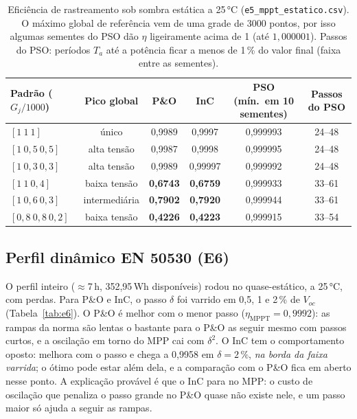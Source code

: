 \documentclass[3p,authoryear]{elsarticle}
\newcommand{\etaM}{\eta_{\mathrm{MPPT}}}
\begin{document}
\begin{table}[!htbp]
\centering\small
\begin{tabular}{lccccc}
\toprule
Padrão ($G_j/1000$) & Pico global & P\&O & InC & PSO (mín.\ em 10 sementes) &
Passos do PSO \\
\midrule
$[1\ 1\ 1]$         & único       & 0,9989 & 0,9997 & 0,999993 & 24--48 \\
$[1\ 0{,}5\ 0{,}5]$ & alta tensão & 0,9987 & 0,9998 & 0,999995 & 24--48 \\
$[1\ 0{,}3\ 0{,}3]$ & alta tensão & 0,9989 & 0,99997 & 0,999992 & 24--48 \\
$[1\ 1\ 0{,}4]$     & baixa tensão & \textbf{0,6743} & \textbf{0,6759} & 0,999933 & 33--61 \\
$[1\ 0{,}6\ 0{,}3]$ & intermediária & \textbf{0,7902} & \textbf{0,7920} & 0,999944 & 33--61 \\
$[0{,}8\ 0{,}8\ 0{,}2]$ & baixa tensão & \textbf{0,4226} & \textbf{0,4223} & 0,999915 & 33--54 \\
\bottomrule
\end{tabular}
\caption{Eficiência de rastreamento sob sombra estática a 25\,°C
(\texttt{e5\_mppt\_estatico.csv}). O máximo global de referência vem de uma grade de 3000
pontos, por isso algumas sementes do PSO dão $\eta$ ligeiramente acima de 1 (até
$1{,}000001$). Passos do PSO: períodos $T_a$ até a potência ficar a menos de 1\,\% do valor
final (faixa entre as sementes).}
\label{tab:e5}
\end{table}

\subsection{Perfil dinâmico EN 50530 (E6)}

O perfil inteiro ($\approx$7\,h, 352,95\,Wh disponíveis) rodou no quase-estático, a 25\,°C,
com perdas. Para P\&O e InC, o passo $\delta$ foi varrido em 0,5, 1 e 2\,\% de $V_{oc}$
(Tabela~\ref{tab:e6}). O P\&O é melhor com o menor passo ($\etaM = 0{,}9992$): as rampas da
norma são lentas o bastante para o P\&O as seguir mesmo com passos curtos, e a oscilação em
torno do MPP cai com $\delta^2$. O InC tem o comportamento oposto: melhora com o passo e
chega a 0,9958 em $\delta = 2\,\%$, \emph{na borda da faixa varrida}; o ótimo pode estar além
dela, e a comparação com o P\&O fica em aberto nesse ponto. A explicação provável é que o
InC para no MPP: o custo de oscilação que penaliza o passo grande no P\&O quase não existe
nele, e um passo maior só ajuda a seguir as rampas.
\end{document}
